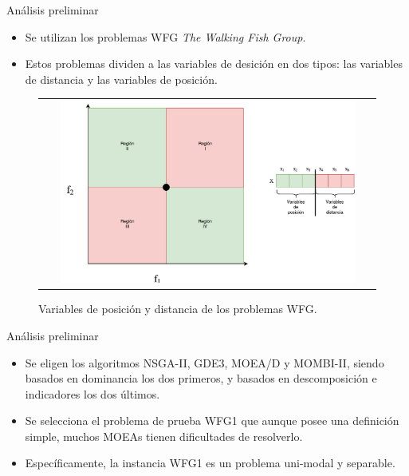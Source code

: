 \documentclass{beamer}
\begin{document}
\begin{frame}{Análisis preliminar}
\begin{itemize}
\scriptsize
\justifying
\item Se utilizan los problemas WFG \textit{The Walking Fish Group}.
\justifying
\item Estos problemas dividen a las variables de desición en dos tipos: las variables de distancia y las variables de posición.
\end{itemize}
\begin{figure}
\centering
\begin{tabular}{c}
 \includegraphics[width=0.9\textwidth]{Parametros_Posicion_Distancia.pdf}   \\
\end{tabular}
\caption{Variables de posición y distancia de los problemas WFG.}
\end{figure}
\end{frame}




\begin{frame}{Análisis preliminar}
\begin{itemize}
\justifying
\item Se eligen los algoritmos NSGA-II, GDE3, MOEA/D y MOMBI-II, siendo basados en dominancia los dos primeros, y basados en descomposición e indicadores los dos últimos.
\justifying
\item Se selecciona el problema de prueba WFG1 que aunque posee una definición simple, muchos MOEAs tienen dificultades de resolverlo.
\justifying
\item Específicamente, la instancia WFG1 es un problema uni-modal y separable.

\end{itemize}
\end{frame}
\end{document}
